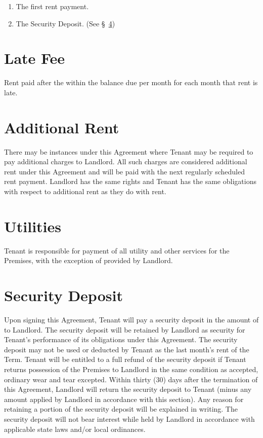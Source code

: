 \documentclass[12pt]{article}
\begin{document}
{\begin{enumerate}[label=\Roman*.]
    \item The first rent payment.
    \item The Security Deposit. (See \S~\ref{sec:security-deposit})
\end{enumerate}

\section{Late Fee}
Rent paid after the %
within %
the balance due per month for each month that rent is late.

\section{Additional Rent}
There may be instances under this Agreement where Tenant may be required to pay additional
charges to Landlord. All such charges are considered additional rent under this Agreement and
will be paid with the next regularly scheduled rent payment. Landlord has the same rights and
Tenant has the same obligations with respect to additional rent as they do with rent.

\section{Utilities}
Tenant is responsible for payment of all utility and other services for the Premises, with the
exception of %
provided by Landlord.

\section{Security Deposit}\label{sec:security-deposit}
Upon signing this Agreement, Tenant will pay a security deposit in the amount of %
to Landlord. The security deposit will be retained by Landlord as security for Tenant's
performance of its obligations under this Agreement. The security deposit may not be used or
deducted by Tenant as the last month's rent of the Term. Tenant will be entitled to a full
refund of the security deposit if Tenant returns possession of the Premises to Landlord in the
same condition as accepted, ordinary wear and tear excepted. Within thirty (30) days after the
termination of this Agreement, Landlord will return the security deposit to Tenant (minus any
amount applied by Landlord in accordance with this section). Any reason for retaining a
portion of the security deposit will be explained in writing. The security deposit will not bear
interest while held by Landlord in accordance with applicable state laws and/or local ordinances.

}
\end{document}

